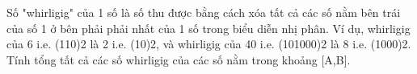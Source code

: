 Số "whirligig" của 1 số là số thu được bằng cách xóa tất cả các số nằm bên trái của số 1 ở bên phải phải nhất của 1 số trong biểu diễn nhị phân. Ví dụ, whirligig của 6 i.e. (110)2 là 2 i.e. (10)2, và whirligig của 40 i.e. (101000)2 là 8 i.e. (1000)2. Tính tổng tất cả các số whirligig của các số nằm trong khoảng [A,B].

\